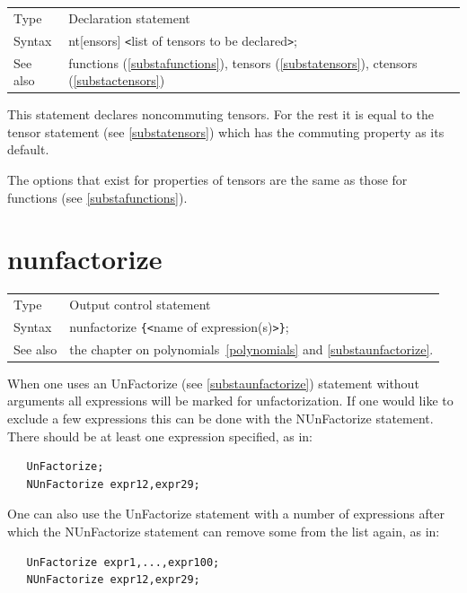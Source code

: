 \noindent \begin{tabular}{ll}
Type & Declaration statement\\
Syntax & nt[ensors] {\tt<}list of tensors to be declared{\tt>}; \\
See also & functions (\ref{substafunctions}), tensors 
            (\ref{substatensors}), ctensors (\ref{substactensors})
\end{tabular} \vspace{4mm}

\noindent This statement declares 
noncommuting tensors. For 
the rest it is equal to the tensor statement (see 
\ref{substatensors}) which has the commuting property as its default.

\noindent The options that exist for properties of tensors are the same as 
those for functions (see \ref{substafunctions}). \vspace{10mm}


\section{nunfactorize}
\label{substanunfactorize}

\noindent \begin{tabular}{ll}
Type & Output control statement\\
Syntax & nunfactorize \verb:{:{\tt<}name of expression(s){\tt>}\verb:}:;
\\ See also & the chapter on polynomials~\ref{polynomials} and 
\ref{substaunfactorize}.
\end{tabular} \vspace{4mm}

\noindent When one uses an UnFactorize (see \ref{substaunfactorize}) 
statement without arguments all expressions will be marked for 
unfactorization. If one would like to exclude a few expressions this can be 
done with the NUnFactorize statement. There should be at least one expression 
specified, as in:
\begin{verbatim}
   UnFactorize;
   NUnFactorize expr12,expr29;
\end{verbatim}
One can also use the UnFactorize statement with a number of expressions after 
which the NUnFactorize statement can remove some from the list again, as in:
\begin{verbatim}
   UnFactorize expr1,...,expr100;
   NUnFactorize expr12,expr29;
\end{verbatim}

